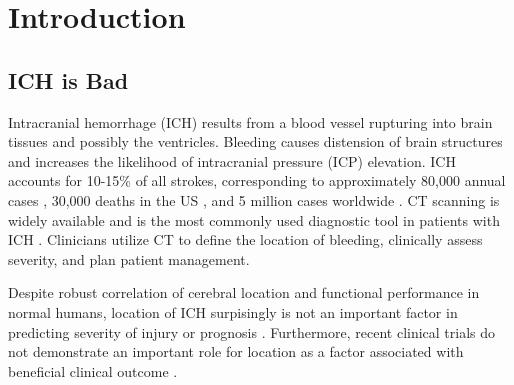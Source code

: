 \documentclass[10pt]{article}\usepackage[]{graphicx}\usepackage[]{color}
\begin{document}
\section{Introduction}
\subsection{ICH is Bad}
Intracranial hemorrhage (ICH) results from a blood vessel rupturing into brain tissues and possibly the ventricles.  Bleeding causes distension of brain structures and increases the likelihood of intracranial pressure (ICP) elevation.  ICH accounts for 10-15\% of all strokes, corresponding to approximately 80,000 annual cases \citep{go_heart_2013}, 30,000 deaths in the US \citep{qureshi_spontaneous_2001}, and 5 million cases worldwide \citep{krishnamurthi_global_2014}.  CT scanning is widely available and is the most commonly used diagnostic tool in patients with ICH \citep{sahni_management_2007}. Clinicians utilize CT to define the location of bleeding, clinically assess severity, and plan patient management. 

Despite robust correlation of cerebral location and functional performance in normal humans, location of ICH surpisingly is not an important factor in predicting severity of injury or prognosis \citep{hemphill_ich_2001, diringer_hydrocephalus:_1998, portenoy_intracerebral_1987, senant_[multi-factorial_1988, daverat_death_1991, broderick_volume_1993, lisk_early_1994, mase_immediate_1995, qureshi_predictors_1995, razzaq_determinants_1998, hallevy_spontaneous_2002, cheung_use_2003}.  Furthermore, recent clinical trials do not demonstrate an important role for location as a factor associated with beneficial clinical outcome \citep{mendelow_early_2005, mendelow_early_2013, anderson_intensive_2008, antihypertensive_treatment_of_acute_cerebral_hemorrhage_atach_investigators_antihypertensive_2010}.  

\end{document}

